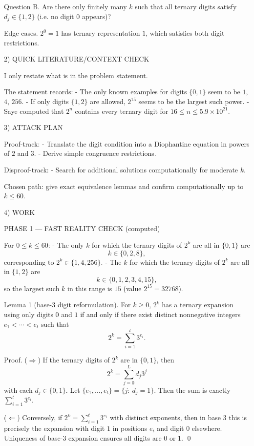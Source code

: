 Question B.
Are there only finitely many $k$ such that all ternary digits satisfy $d_j\in\{1,2\}$ (i.e. no digit $0$ appears)?

Edge cases.
$2^0=1$ has ternary representation $1$, which satisfies both digit restrictions.

2) QUICK LITERATURE/CONTEXT CHECK

I only restate what is in the problem statement.

The statement records:
- The only known examples for digits $\{0,1\}$ seem to be $1$, $4$, $256$.
- If only digits $\{1,2\}$ are allowed, $2^{15}$ seems to be the largest such power.
- Saye computed that $2^n$ contains every ternary digit for $16\le n\le 5.9\times 10^{21}$.

3) ATTACK PLAN

Proof-track:
- Translate the digit condition into a Diophantine equation in powers of $2$ and $3$.
- Derive simple congruence restrictions.

Disproof-track:
- Search for additional solutions computationally for moderate $k$.

Chosen path: give exact equivalence lemmas and confirm computationally up to $k\le 60$.

4) WORK

PHASE 1 — FAST REALITY CHECK (computed)

For $0\le k\le 60$:
- The only $k$ for which the ternary digits of $2^k$ are all in $\{0,1\}$ are
\[
 k\in\{0,2,8\},
\]
corresponding to $2^k\in\{1,4,256\}$.
- The $k$ for which the ternary digits of $2^k$ are all in $\{1,2\}$ are
\[
 k\in\{0,1,2,3,4,15\},
\]
so the largest such $k$ in this range is $15$ (value $2^{15}=32768$).

Lemma 1 (base-$3$ digit reformulation).
For $k\ge 0$, $2^k$ has a ternary expansion using only digits $0$ and $1$ if and only if there exist distinct nonnegative integers $e_1<\cdots<e_t$ such that
\[
2^k=\sum_{i=1}^t 3^{e_i}.
\]

Proof.
($\Rightarrow$) If the ternary digits of $2^k$ are in $\{0,1\}$, then
\[
2^k=\sum_{j=0}^L d_j 3^j
\]
with each $d_j\in\{0,1\}$. Let $\{e_1,\dots,e_t\}=\{j:\ d_j=1\}$. Then the sum is exactly $\sum_{i=1}^t 3^{e_i}$.

($\Leftarrow$) Conversely, if $2^k=\sum_{i=1}^t 3^{e_i}$ with distinct exponents, then in base $3$ this is precisely the expansion with digit $1$ in positions $e_i$ and digit $0$ elsewhere. Uniqueness of base-$3$ expansion ensures all digits are $0$ or $1$. \qed

